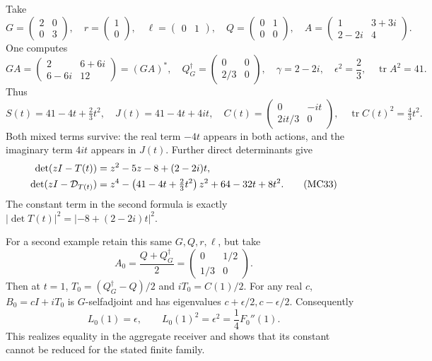 \documentclass[11pt]{article}
\newcommand{\tr}{\operatorname{tr}}
\newcommand{\adj}{\dagger_G}
\begin{document}
Take
\begin{equation}
 G=\begin{pmatrix}2&0\\0&3\end{pmatrix},\quad
 r=\begin{pmatrix}1\\0\end{pmatrix},\quad
 \ell=\begin{pmatrix}0&1\end{pmatrix},\quad
 Q=\begin{pmatrix}0&1\\0&0\end{pmatrix},\quad
 A=\begin{pmatrix}1&3+3i\\2-2i&4\end{pmatrix}.
 \tag{MC31}\label{MC31}
\end{equation}
One computes
\[
 GA=\begin{pmatrix}2&6+6i\\6-6i&12\end{pmatrix}=(GA)^*,
 \quad Q^\adj=\begin{pmatrix}0&0\\2/3&0\end{pmatrix},
 \quad \gamma=2-2i,\quad \epsilon^2=\frac23,\quad\tr A^2=41.
\]
Thus
\begin{equation}
 S(t)=41-4t+\tfrac23t^2,\quad
 J(t)=41-4t+4it,\quad
 C(t)=\begin{pmatrix}0&-it\\2it/3&0\end{pmatrix},\quad
 \tr C(t)^2=\tfrac43t^2.
 \tag{MC32}\label{MC32}
\end{equation}
Both mixed terms survive: the real term \(-4t\) appears in both
actions, and the imaginary term \(4it\) appears in \(J(t)\).
Further direct determinants give
\begin{align}
 \det(zI-T(t))&=z^2-5z-8+(2-2i)t,\notag\\
 \det(zI-\mathcal D_{T(t)})
 &=z^4-\left(41-4t+\tfrac23t^2\right)z^2
       +64-32t+8t^2.
 \tag{MC33}\label{MC33}
\end{align}
The constant term in the second formula is exactly
\(|\det T(t)|^2=|-8+(2-2i)t|^2\).

For a second example retain this same \(G,Q,r,\ell\), but take
\[
 A_0=\frac{Q+Q^\adj}{2}
   =\begin{pmatrix}0&1/2\\1/3&0\end{pmatrix}.
\]
Then at \(t=1\),
\(T_0=(Q^\adj-Q)/2\) and \(iT_0=C(1)/2\).
For any real \(c\), \(B_0=cI+iT_0\) is \(G\)-selfadjoint and
has eigenvalues \(c+\epsilon/2,c-\epsilon/2\). Consequently
\begin{equation}
 L_0(1)=\epsilon,\qquad
 L_0(1)^2=\epsilon^2=\frac14F_0''(1).
 \tag{MC34}\label{MC34}
\end{equation}
This realizes equality in the aggregate receiver and shows that its
constant cannot be reduced for the stated finite family.
\end{document}

